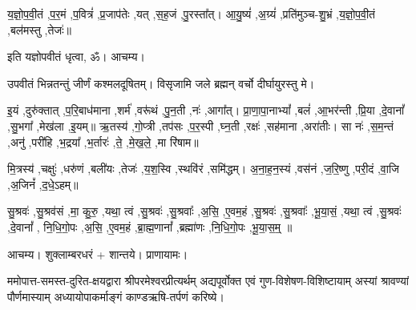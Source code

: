 
य॒ज्ञो॒प॒वी॒तं \sep प॒र॒मं \sep प॒वित्रं॑ \sep प्र॒जाप॑तेः \sep यत् \sep स॒ह॒जं \sep पु॒रस्ता᳚त्। आ॒यु॒ष्यं॑ \sep अ॒ग्र्यं॑ \sep प्रति॑मुञ्च-शु॒भ्रं \sep य॒ज्ञो॒प॒वी॒तं \sep बल॑मस्तु \sep तेजः॑॥

इति यज्ञोपवीतं धृत्वा, ॐ। आचम्य।

उपवीतं भिन्नतन्तुं जीर्णं कश्मलदूषितम्। विसृजामि जले ब्रह्मन् वर्चो दीर्घायुरस्तु मे।




इ॒यं \sep दुरु॑क्तात् \sep प॒रि॒बाध॑माना \sep शर्म॑ \sep वरू॑थं \sep पु॒न॒ती \sep नः॑ \sep आगा᳚त्।
प्रा॒णा॒पा॒नाभ्यां᳚ \sep बलं॑ \sep आ॒भर॑न्ती \sep प्रि॒या \sep दे॒वानां᳚ \sep सु॒भगा᳚ \sep मेख॑ला \sep इ॒यम्॥ 
ऋ॒तस्य॑ \sep गो॒प्त्री \sep तप॑सः \sep प॒र॒स्पी \sep घ्न॒ती \sep रक्षः॑ \sep सह॑माना \sep अरा॑तीः।
सा नः॑ \sep स॒म॒न्तं \sep अनु॑ \sep परी॑हि \sep भ॒द्रया᳚ \sep भ॒र्तारः॑ \sep ते॒ \sep मे॒ख॒ले॒ \sep मा रि॑षाम॥



मि॒त्रस्य॑ \sep चक्षुः॑ \sep धरु॑णं \sep बली॑यः \sep तेजः॑ \sep य॒श॒स्वि \sep स्थवि॑रं \sep समि॑द्धम्। 
अ॒ना॒ह॒न॒स्यं \sep वस॑नं \sep ज॒रि॒ष्णु \sep परी॒दं \sep वा॒जि \sep अ॒जिनं᳚ \sep द॒धे॒ऽहम्॥


सु॒श्रवः॑ \sep सु॒श्रव॑सं \sep मा॒ कु॒रु॒ \sep यथा॒ त्वं \sep सु॒श्रवः॑ \sep सु॒श्रवाः᳚ \sep अ॒सि॒ \sep ए॒वम॒हं \sep सु॒श्रवः॑ \sep सु॒श्रवाः᳚ \sep भू॒या॒सं॒ \sep यथा॒ त्वं \sep सु॒श्रवः॑ \sep दे॒वानां᳚ \sep
नि॒धि॒गो॒पः \sep अ॒सि॒ \sep ए॒वम॒हं \sep ब्रा॒ह्म॒णानां᳚ \sep ब्रह्मा॑णः \sep नि॒धि॒गो॒पः \sep भू॒या॒स॒म्॒ ॥


आचम्य। शुक्लाम्बरधरं + शान्तये। प्राणायामः।

ममोपात्त-समस्त-दुरित-क्षयद्वारा श्रीपरमेश्वरप्रीत्यर्थम्
अद्य\-पूर्वोक्त एवं गुण-विशेषण-विशिष्टायाम्
अस्यां श्रावण्यां पौर्णमास्याम् अध्यायोपाकर्माङ्गं काण्डऋषि-तर्पणं करिष्ये।


